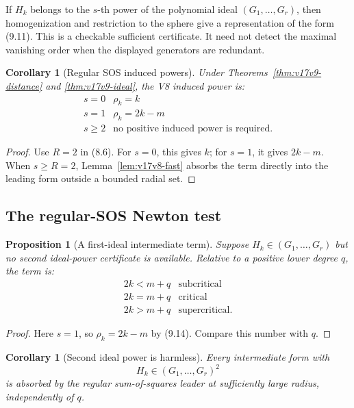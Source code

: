 \documentclass[11pt]{article}
\newtheorem{proposition}[theorem]{Proposition}
\newtheorem{corollary}[theorem]{Corollary}
\theoremstyle{remark}
\begin{document}
If \(H_k\) belongs to the \(s\)-th power of the polynomial ideal
\((G_1,\ldots,G_r)\), then homogenization and restriction to the
sphere give a representation of the form (9.11).  This is a
checkable sufficient certificate.  It need not detect the maximal
vanishing order when the displayed generators are redundant.

\begin{corollary}[Regular SOS induced powers]
\label{cor:v17v9-induced}
Under Theorems~\ref{thm:v17v9-distance} and
\ref{thm:v17v9-ideal}, the V8 induced power is:
\[
\begin{array}{c|c}
s=0&\rho_k=k\\
s=1&\rho_k=2k-m\\
s\geq2&\text{no positive induced power is required}.
\end{array}                                         \tag{9.14}
\]
\end{corollary}

\begin{proof}
Use \(R=2\) in (8.6).  For \(s=0\), this gives \(k\); for \(s=1\),
it gives \(2k-m\).  When \(s\geq R=2\),
Lemma~\ref{lem:v17v8-fast} absorbs the term directly into the leading
form outside a bounded radial set.
\end{proof}

\subsection{The regular-SOS Newton test}

\begin{proposition}[A first-ideal intermediate term]
\label{prop:v17v9-first-ideal}
Suppose \(H_k\in(G_1,\ldots,G_r)\) but no second ideal-power
certificate is available.  Relative to a positive lower degree
\(q\), the term is:
\[
\begin{array}{c|c}
2k<m+q&\text{subcritical}\\
2k=m+q&\text{critical}\\
2k>m+q&\text{supercritical}.
\end{array}                                         \tag{9.15}
\]
\end{proposition}

\begin{proof}
Here \(s=1\), so \(\rho_k=2k-m\) by (9.14).  Compare this number with
\(q\).
\end{proof}

\begin{corollary}[Second ideal power is harmless]
\label{cor:v17v9-second-ideal}
Every intermediate form with
\[
 H_k\in(G_1,\ldots,G_r)^2                           \tag{9.16}
\]
is absorbed by the regular sum-of-squares leader at sufficiently
large radius, independently of \(q\).
\end{corollary}
\end{document}
